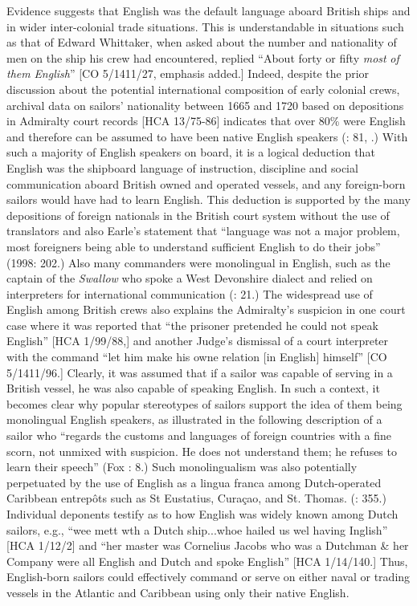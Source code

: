   Evidence suggests that English was the default language aboard British ships and in wider inter-colonial trade situations. This is understandable in situations such as that of Edward Whittaker, when asked about the number and nationality of men on the ship his crew had encountered, replied “About forty or fifty \textit{most} \textit{of} \textit{them} \textit{English}” [CO 5/1411/27, emphasis added.] Indeed, despite the prior discussion about the potential international composition of early colonial crews, archival data on sailors’ nationality between 1665 and 1720 based on depositions in Admiralty court records [HCA 13/75-86] indicates that over 80\% were English and therefore can be assumed to have been native English speakers (\citealt{Earle1993}: 81, .) With such a majority of English speakers on board, it is a logical deduction that English was the shipboard language of instruction, discipline and social communication aboard British owned and operated vessels, and any foreign-born sailors would have had to learn English. This deduction is supported by the many depositions of foreign nationals in the British court system without the use of translators and also Earle’s statement that “language was not a major problem, most foreigners being able to understand sufficient English to do their jobs” (1998: 202.) Also many commanders were monolingual in English, such as the captain of the \textit{Swallow} who spoke a West Devonshire dialect and relied on interpreters for international communication (\citealt{Earle1998}: 21.) The widespread use of English among British crews also explains the Admiralty’s suspicion in one court case where it was reported that “the prisoner pretended he could not speak English” [HCA 1/99/88,] and another Judge’s dismissal of a court interpreter with the command “let him make his owne relation [in English] himself” [CO 5/1411/96.] Clearly, it was assumed that if a sailor was capable of serving in a British vessel, he was also capable of speaking English.  In such a context, it becomes clear why popular stereotypes of sailors support the idea of them being monolingual English speakers, as illustrated in the following description of a sailor who “regards the customs and languages of foreign countries with a fine scorn, not unmixed with suspicion. He does not understand them; he refuses to learn their speech” (Fox \citealt{Smith1924}: 8.) Such monolingualism was also potentially perpetuated by the use of English as a lingua franca among Dutch-operated Caribbean entrepôts such as St Eustatius, Curaçao, and St. Thomas. (\citealt{Jarvis2010}: 355.) Individual deponents testify as to how English was widely known among Dutch sailors, e.g., “wee mett wth a Dutch ship...whoe hailed us wel having Inglish” [HCA 1/12/2] and “her master was Cornelius Jacobs who was a Dutchman \& her Company were all English and Dutch and spoke English” [HCA 1/14/140.] Thus, English-born sailors could effectively command or serve on either naval or trading vessels in the Atlantic and Caribbean using only their native English. 

